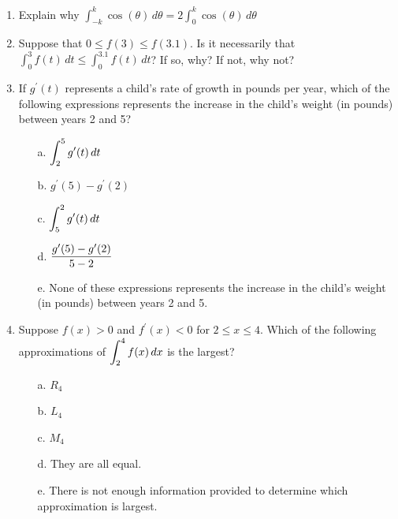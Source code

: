 \documentclass[12pt]{report}
\begin{document}
\begin{enumerate}

\item Explain why $\int_{-k}^k\cos(\theta)\,d\theta=2\int_0^k\cos(\theta)\,d\theta$

\item Suppose that $0\leq f(3)\leq f(3.1)$. Is it necessarily  that $\int_0^3f(t)\, dt\leq \int_0^{3.1}f(t)\, dt$? If so, why? If not, why not? 

\item If $g^\prime(t)$ represents a child's rate of growth in pounds per year, which of the following expressions represents the increase in the child's weight (in pounds) between years 2 and 5?
\vspace{0.2cm}
\begin{enumerate}
\item[a.] $\displaystyle \int_2^5 g^\prime(t)\,dt$ \vspace{0.2cm}
\item[b.] $g^\prime(5) - g^\prime(2)$ \vspace{0.2cm}
\item[c.] $\displaystyle \int_5^2 g^\prime(t)\,dt$ \vspace{0.2cm}
\item[d.] $\displaystyle \frac{g^\prime(5) - g^\prime(2)}{5-2}$ \vspace{0.2cm} 
\item[e.] None of these expressions represents the increase in the child's weight (in pounds) between years 2 and 5.
\end{enumerate}

\item Suppose $f(x) > 0$ and $f^\prime(x) < 0$ for $2 \le x \le 4$. Which of the following approximations of $\displaystyle \int_2^4 f(x)\,dx$ is the largest?
\begin{enumerate}
\item[a.] $R_4$ \vspace{0.1cm}
\item[b.] $L_4$ \vspace{0.1cm}
\item[c.] $M_4$ \vspace{0.1cm}
\item[d.] They are all equal. \vspace{0.1cm}
\item[e.] There is not enough information provided to determine which approximation is largest.
\end{enumerate}


\end{enumerate}
\end{document}
